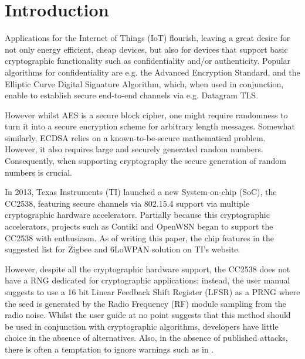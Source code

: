 \section{Introduction}
Applications for the Internet of Things (IoT) flourish, leaving a great desire for not only energy efficient, cheap devices, but also for devices that support basic cryptographic functionality such as confidentiality and/or authenticity. Popular algorithms for confidentiality are e.g. the Advanced Encryption Standard\cite{AES}, and the Elliptic Curve Digital Signature Algorithm\cite{ECDSA}, which, when used in conjunction, enable to establish secure end-to-end channels via e.g. Datagram TLS\cite{DTLS}. 

However whilst AES is a secure block cipher, one might require randomness to turn it into a secure encryption scheme for arbitrary length messages. Somewhat similarly, ECDSA relies on a known-to-be-secure mathematical problem. However, it also requires large and securely generated random numbers. Consequently, when supporting cryptography the secure generation of random numbers is crucial. 


In 2013, Texas Instruments (TI) launched a new System-on-chip (SoC), the CC2538\cite{CC2538}, featuring secure channels via 802.15.4\cite{802154Standard} support via multiple cryptographic hardware accelerators. Partially because this cryptographic accelerators, projects such as Contiki\cite{Contiki} and OpenWSN\cite{OpenWSN} began to support the CC2538 with enthusiasm. As of writing this paper, the chip features in the suggested list for Zigbee and 6LoWPAN solution on TI's website\cite{ZigbeeProducts}\cite{6LowPANProducts}.

However, despite all the cryptographic hardware support, the CC2538 does not have a RNG dedicated for cryptographic applications; instead, the user manual suggests to use a 16 bit Linear Feedback Shift Register (LFSR) as a PRNG where the seed is generated by the Radio Frequency (RF) module sampling from the radio noise. Whilst the user guide at no point suggests that this method should be used in conjunction with cryptographic algorithms, developers have little choice in the absence of alternatives. Also, in the absence of published attacks, there is often a temptation to ignore warnings such as in \cite{SmartMeterBlog}. 

